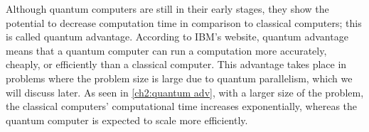 \documentclass[a4paper]{report}
\begin{document}
{\begin{itemize}
Although quantum computers are still in their early stages, they show the potential to decrease computation time in comparison to classical computers; this is called quantum advantage. According to IBM's website, quantum advantage means that a quantum computer can run a computation more accurately, cheaply, or efficiently than a classical computer. \cite{quantumadv}
This advantage takes place in problems where the problem size is large due to quantum parallelism, which we will discuss later. As seen in \ref{ch2:quantum adv}, with a larger size of the problem, the classical computers' computational time increases exponentially, whereas the quantum computer is expected to scale more efficiently.
\newline

\begin{figure}[ht]
    \centering
{}
\end{figure}
\end{itemize}}
\end{document}
